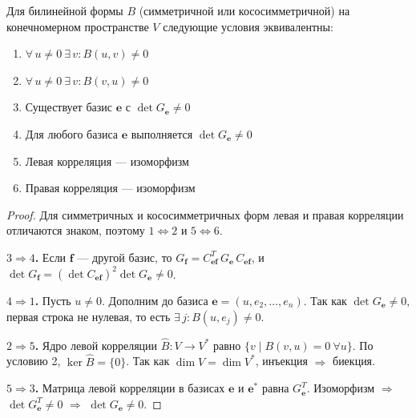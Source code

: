 \begin{theorem}
    Для билинейной формы $B$ (симметричной или кососимметричной) на конечномерном пространстве $V$ следующие условия эквивалентны:
    \begin{enumerate}
        \item $\forall\, u \neq 0\ \exists\, v\colon B(u, v) \neq 0$
        \item $\forall\, u \neq 0\ \exists\, v\colon B(v, u) \neq 0$
        \item Существует базис $\mathbf{e}$ с $\det G_{\mathbf{e}} \neq 0$
        \item Для любого базиса $\mathbf{e}$ выполняется $\det G_{\mathbf{e}} \neq 0$
        \item Левая корреляция --- изоморфизм
        \item Правая корреляция --- изоморфизм
    \end{enumerate}

    \begin{proof}
        Для симметричных и кососимметричных форм левая и правая корреляции отличаются знаком, поэтому $1 \Leftrightarrow 2$ и $5 \Leftrightarrow 6$.

        \textbf{$3 \Rightarrow 4$.} Если $\mathbf{f}$ --- другой базис, то $G_{\mathbf{f}} = C_{\mathbf{e}\mathbf{f}}^T\, G_{\mathbf{e}}\, C_{\mathbf{e}\mathbf{f}}$, и $\det G_{\mathbf{f}} = (\det C_{\mathbf{e}\mathbf{f}})^2 \det G_{\mathbf{e}} \neq 0$.

        \textbf{$4 \Rightarrow 1$.} Пусть $u \neq 0$. Дополним до базиса $\mathbf{e} = (u, e_2, \dots, e_n)$. Так как $\det G_{\mathbf{e}} \neq 0$, первая строка не нулевая, то есть $\exists\, j\colon B(u, e_j) \neq 0$.

        \textbf{$2 \Rightarrow 5$.} Ядро левой корреляции $\hat{B}\colon V \to V^*$ равно $\{v \mid B(v, u) = 0\ \forall u\}$. По условию 2, $\ker\hat{B} = \{0\}$. Так как $\dim V = \dim V^*$, инъекция $\Rightarrow$ биекция.

        \textbf{$5 \Rightarrow 3$.} Матрица левой корреляции в базисах $\mathbf{e}$ и $\mathbf{e}^*$ равна $G_{\mathbf{e}}^T$. Изоморфизм $\Rightarrow$ $\det G_{\mathbf{e}}^T \neq 0$ $\Rightarrow$ $\det G_{\mathbf{e}} \neq 0$.
    \end{proof}
\end{theorem}


